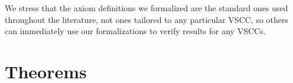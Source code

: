 \documentclass[runningheads]{llncs}
\begin{document}
\begin{comment}
as in the following definition for removing a voter \texttt{i} from a profile of type \texttt{Prof V X} to obtain a profile of type  \texttt{ Prof $\{$v : V // v $\neq$ i$\}$ X} (cf.~Section \ref{ClonesSection} for the analogue for candidates):

\begin{itemize}
\item[] \texttt{\textcolor{blue}{def} \textcolor{orange}{minus\_voter} $\{$V X : \textcolor{blue}{Type}$\}$ (P : Prof V X) (i : V) : \\ Prof $\{$v : V // v $\neq$ i$\}$ X := $\lambda$ v x y, P v.val x y}
\end{itemize}
\end{comment}

We stress that the axiom definitions we formalized are the standard ones used throughout the literature, not ones tailored to any particular VSCC, so others can immediately use our formalizations to verify results for any VSCCs.


\begin{comment}
\whnote{Let's think about how to formalize the following...}

\begin{definition} \textnormal{Given $X\subseteq\mathcal{X}$, a \textit{choice function on $X$} is a function that assigns to each nonempty $Y\subseteq X$ a nonempty $C(Y)\subseteq Y$.}
\end{definition}

\begin{definition}\textnormal{For $V\subseteq\mathcal{V}$ and $X\subseteq\mathcal{X}$, a \textit{functional collective choice rule for $(V,X)$}, or \textit{$(V,X)$-FCCR}, is a function $\mathbb{F}$ that assigns to each $\mathbf{Q}\in  \mathsf{Prof}(V,X)$ a choice function on $X$.}\end{definition}

\begin{definition}\label{VCCR} \textnormal{A \emph{variable-election functional collective choice rule} (VFCCR) is a function $f$ that assigns to each pair $(V,X)$ of a $V\subseteq\mathcal{V}$ and $X\subseteq\mathcal{X}$ a $(V,X)$-FCCR.}%
\end{definition}
\end{comment}

\section{Theorems}\label{Theorems}
\end{document}
